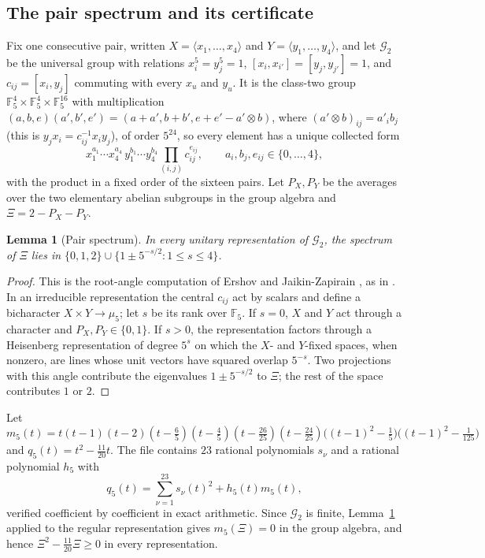 \documentclass[11pt]{article}
\newtheorem{lemma}[theorem]{Lemma}
\begin{document}
\subsection*{The pair spectrum and its certificate}
Fix one consecutive pair, written $X=\langle x_1,\dots,x_4\rangle$ and $Y=\langle y_1,\dots,y_4\rangle$, and let $\mathcal G_2$ be the universal group with relations $x_i^5=y_j^5=1$, $[x_i,x_{i'}]=[y_j,y_{j'}]=1$, and $c_{ij}=[x_i,y_j]$ commuting with every $x_u$ and $y_u$.  It is the class-two group $\mathbb F_5^4\times\mathbb F_5^4\times\mathbb F_5^{16}$ with multiplication $(a,b,e)(a',b',e')=(a+a',b+b',e+e'-a'\otimes b)$, where $(a'\otimes b)_{ij}=a'_ib_j$ (this is $y_jx_i=c_{ij}^{-1}x_iy_j$), of order $5^{24}$, so every element has a unique collected form
\begin{equation}\label{eq:f5nf}
 x_1^{a_1}\cdots x_4^{a_4}\,y_1^{b_1}\cdots y_4^{b_4}\prod_{(i,j)}c_{ij}^{e_{ij}},\qquad a_i,b_j,e_{ij}\in\{0,\dots,4\},
\end{equation}
with the product in a fixed order of the sixteen pairs.  Let $P_X,P_Y$ be the averages over the two elementary abelian subgroups in the group algebra and $\Xi=2-P_X-P_Y$.

\begin{lemma}[Pair spectrum]\label{lem:f5pairspectrum}
In every unitary representation of $\mathcal G_2$, the spectrum of $\Xi$ lies in $\{0,1,2\}\cup\{1\pm5^{-s/2}:1\le s\le4\}$.
\end{lemma}
\begin{proof}
This is the root-angle computation of Ershov and Jaikin-Zapirain \cite{EJZ10}, as in \cite[(3.2)]{WangZhi26}.  In an irreducible representation the central $c_{ij}$ act by scalars and define a bicharacter $X\times Y\to\mu_5$; let $s$ be its rank over $\mathbb F_5$.  If $s=0$, $X$ and $Y$ act through a character and $P_X,P_Y\in\{0,1\}$.  If $s>0$, the representation factors through a Heisenberg representation of degree $5^s$ on which the $X$- and $Y$-fixed spaces, when nonzero, are lines whose unit vectors have squared overlap $5^{-s}$.  Two projections with this angle contribute the eigenvalues $1\pm5^{-s/2}$ to $\Xi$; the rest of the space contributes $1$ or $2$.
\end{proof}

Let
\[
 m_5(t)=t(t-1)(t-2)(t-\tfrac65)(t-\tfrac45)(t-\tfrac{26}{25})(t-\tfrac{24}{25})\bigl((t-1)^2-\tfrac15\bigr)\bigl((t-1)^2-\tfrac1{125}\bigr)
\]
and $q_5(t)=t^2-\tfrac{11}{20}t$.  The file  contains $23$ rational polynomials $s_\nu$ and a rational polynomial $h_5$ with
\begin{equation}\label{eq:f5sos}
 q_5(t)=\sum_{\nu=1}^{23}s_\nu(t)^2+h_5(t)m_5(t),
\end{equation}
verified coefficient by coefficient in exact arithmetic.  Since $\mathcal G_2$ is finite, Lemma~\ref{lem:f5pairspectrum} applied to the regular representation gives $m_5(\Xi)=0$ in the group algebra, and hence $\Xi^2-\tfrac{11}{20}\Xi\ge0$ in every representation.
\end{document}

